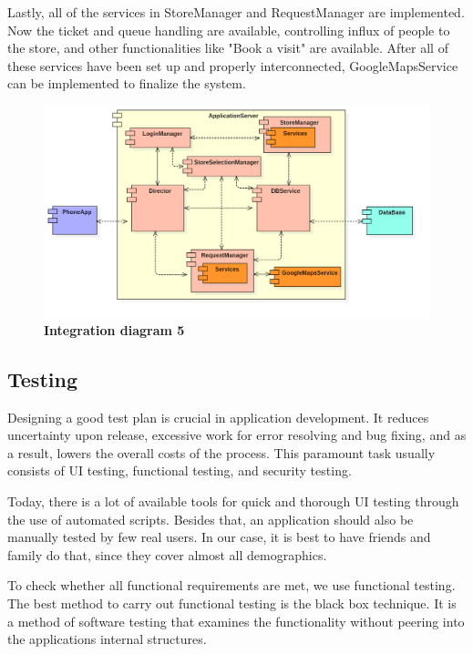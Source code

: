 Lastly, all of the services in StoreManager and RequestManager are implemented. Now the ticket and queue handling are available, controlling influx of people to the store, and other functionalities like "Book a visit" are available. After all of these services have been set up and properly interconnected, GoogleMapsService can be implemented to finalize the system.

\begin{figure}[!h]
\centering
\includegraphics[width=\textwidth]{Images/IntegrationDiagram5}
\caption{\label{fig:imp5}\textbf{Integration diagram 5}}
\end{figure} \newpage

\subsection{Testing}

\hspace{\parindent}Designing a good test plan is crucial in application development. It reduces uncertainty upon release, excessive work for error resolving and bug fixing, and as a result, lowers the overall costs of the process. This paramount task usually consists of UI testing, functional testing, and security testing. \newline

Today, there is a lot of available tools for quick and thorough UI testing through the use of automated scripts. Besides that, an application should also be manually tested by few real users. In our case, it is best to have friends and family do that, since they cover almost all demographics. 

To check whether all functional requirements are met, we use functional testing. The best method to carry out functional testing is the black box technique.  It is a method of software testing that examines the functionality without peering into the applications internal structures. \newline

